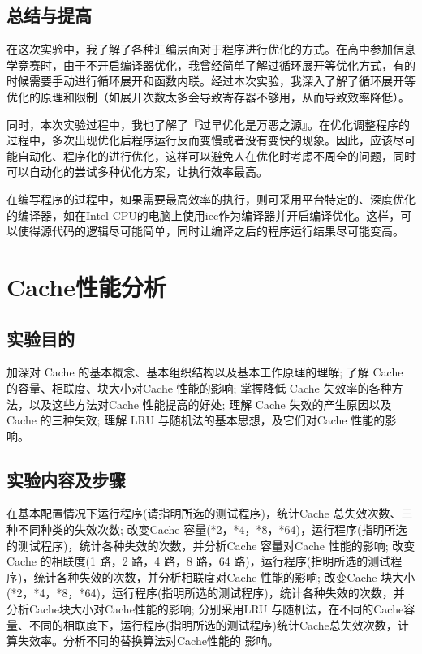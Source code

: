 \documentclass{ctexrep}
\begin{document}
\section{总结与提高}

在这次实验中，我了解了各种汇编层面对于程序进行优化的方式。在高中参加信息学竞赛时，由于不开启编译器优化，我曾经简单了解过循环展开等优化方式，有的时候需要手动进行循环展开和函数内联。经过本次实验，我深入了解了循环展开等优化的原理和限制（如展开次数太多会导致寄存器不够用，从而导致效率降低）。

同时，本次实验过程中，我也了解了『过早优化是万恶之源』。在优化调整程序的过程中，多次出现优化后程序运行反而变慢或者没有变快的现象。因此，应该尽可能自动化、程序化的进行优化，这样可以避免人在优化时考虑不周全的问题，同时可以自动化的尝试多种优化方案，让执行效率最高。

在编写程序的过程中，如果需要最高效率的执行，则可采用平台特定的、深度优化的编译器，如在Intel CPU的电脑上使用icc作为编译器并开启编译优化。这样，可以使得源代码的逻辑尽可能简单，同时让编译之后的程序运行结果尽可能变高。

\chapter{Cache性能分析}
\section{实验目的}
\begin{outline}[enumerate]
    \1 加深对 Cache 的基本概念、基本组织结构以及基本工作原理的理解;
    \1 了解 Cache 的容量、相联度、块大小对Cache 性能的影响;
    \1 掌握降低 Cache 失效率的各种方法，以及这些方法对Cache 性能提高的好处;
    \1 理解 Cache 失效的产生原因以及Cache 的三种失效;
    \1 理解 LRU 与随机法的基本思想，及它们对Cache 性能的影响。
\end{outline}
\section{实验内容及步骤}
\begin{outline}[enumerate]
    \1 在基本配置情况下运行程序(请指明所选的测试程序)，统计Cache 总失效次数、三种不同种类的失效次数;
    \1 改变Cache 容量(*2，*4，*8，*64)，运行程序(指明所选的测试程序)，统计各种失效的次数，并分析Cache 容量对Cache 性能的影响;
    \1 改变Cache 的相联度(1 路，2 路，4 路，8 路，64 路)，运行程序(指明所选的测试程序)，统计各种失效的次数，并分析相联度对Cache 性能的影响;
    \1 改变Cache 块大小(*2，*4，*8，*64)，运行程序(指明所选的测试程序)，统计各种失效的次数，并分析Cache块大小对Cache性能的影响;
    \1 分别采用LRU 与随机法，在不同的Cache容量、不同的相联度下，运行程序(指明所选的测试程序)统计Cache总失效次数，计算失效率。分析不同的替换算法对Cache性能的 影响。
\end{outline}
\end{document}
